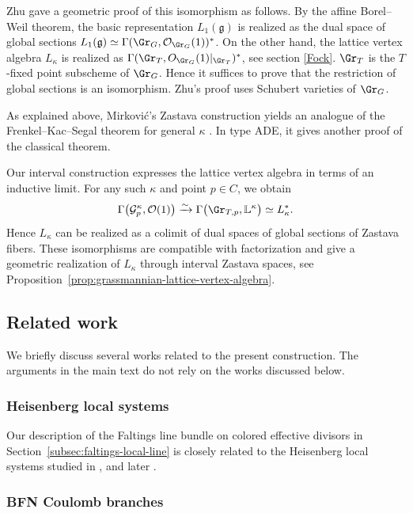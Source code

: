 \documentclass{amsart}
\numberwithin{equation}{section}
\numberwithin{figure}{section}
\theoremstyle{definition}
\theoremstyle{remark}
\renewcommand{\c}[1]{\mathcal{#1}}
\newcommand{\f}[1]{\mathfrak{#1}}
\begin{document}
Zhu gave a geometric proof of this isomorphism
\cite[\S3]{zhu2009affine} as follows.
By the affine Borel--Weil theorem, the basic representation $L_1(\f g)$ is realized as the dual space of global sections 
$L_1(\f g)\simeq \Gamma(\Gr_G,\c O_{\Gr_G}(1))^*$. On the other hand, the lattice vertex algebra $L_\kappa$ is
realized as $\Gamma(\Gr_T,O_{\Gr_G}(1)|_{\Gr_T})^*$, see section \ref{Fock}. 
$\Gr_T$ is the \(T\)-fixed point subscheme of $\Gr_G$. Hence it suffices to prove that the restriction of global sections is an isomorphism. Zhu's proof uses Schubert varieties of $\Gr_G$.

As explained above, Mirkovi\'c's Zastava construction yields an
analogue of the Frenkel--Kac--Segal theorem for general $\kappa$
\cite{mirkovic2021loop,mirkovic2023lattice}. In type ADE, it gives
another proof of the classical theorem.

Our interval construction expresses the lattice vertex algebra in
terms of an inductive limit. For any such $\kappa$ and point $p\in C$,
we obtain
\[
\Gamma\bigl(\mathcal G^\kappa_p,\mathcal O(1)\bigr)
\xrightarrow{\sim}
\Gamma\bigl(\Gr_{T,p},\mathbb L^\kappa\bigr)
\simeq L_\kappa^*.
\]
Hence $L_\kappa$ can be realized as a colimit of dual spaces of global sections of Zastava fibers. These isomorphisms are compatible with factorization and give a
geometric realization of $L_\kappa$ through interval Zastava spaces,
see Proposition~\ref{prop:grassmannian-lattice-vertex-algebra}.

\subsection{Related work}
We briefly discuss several works related to the present construction.
The arguments in the main text do not rely on the works discussed below.

\subsubsection{Heisenberg local systems}
Our description of the Faltings line bundle on colored
effective divisors in Section~\ref{subsec:faltings-local-line}
is closely related to the Heisenberg local systems studied in
\cite{bezrukavnikov2006factorizable}, and later \cite{gaitsgory2019metaplectic, gaitsgory2021factorization}.

\subsubsection{BFN Coulomb branches}
\end{document}
